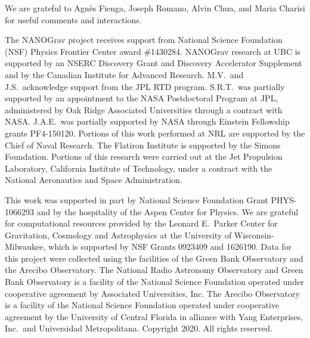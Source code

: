 We are grateful to Agn\`es Fienga, Joseph Romano, Alvin Chua, and Maria Charisi for useful comments and interactions.

The NANOGrav project receives support from National Science Foundation (NSF) Physics Frontier Center award \#1430284.
NANOGrav research at UBC is supported by an NSERC Discovery Grant and Discovery Accelerator Supplement and by the Canadian Institute for Advanced Research.
M.V.\ and J.S.\ acknowledge support from the JPL RTD program.
S.R.T.\ was partially supported by an appointment to the NASA Postdoctoral Program at JPL, administered by Oak Ridge Associated Universities through a contract with NASA.
J.A.E.\ was partially supported by NASA through Einstein Fellowship grants PF4-150120.
Portions of this work performed at NRL are supported by the Chief of Naval Research.
The Flatiron Institute is supported by the Simons Foundation.
Portions of this research were carried out at the Jet Propulsion Laboratory, California Institute of Technology, under a contract with the National Aeronautics and Space Administration.

This work was supported in part by National Science Foundation Grant PHYS-1066293 and by the hospitality of the Aspen Center for Physics.
We are grateful for computational resources provided by the Leonard E.\ Parker Center for Gravitation, Cosmology and Astrophysics at the University of Wisconsin-Milwaukee, which is supported by NSF Grants 0923409 and 1626190.
Data for this project were collected using the facilities of the Green Bank Observatory and the Arecibo Observatory.
The National Radio Astronomy Observatory and Green Bank Observatory is a facility of the National Science Foundation operated under cooperative agreement by Associated Universities, Inc.
The Arecibo Observatory is a facility of the National Science Foundation operated under cooperative agreement by the University of Central Florida in alliance with Yang Enterprises, Inc.\ and Universidad Metropolitana.
Copyright 2020. All rights reserved.
